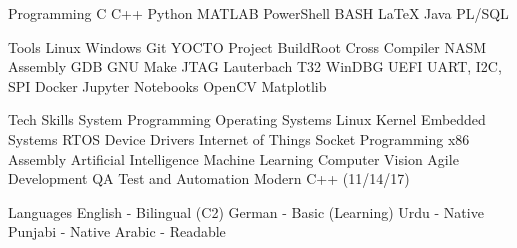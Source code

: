 

\begin{cvskills}

\cvskill
{Programming} %
{C \SkillSep C++ \SkillSep Python \SkillSep MATLAB \SkillSep PowerShell \SkillSep BASH \SkillSep LaTeX \SkillSep Java \SkillSep PL/SQL} %

\cvskill
{Tools} %
{Linux \SkillSep Windows \SkillSep Git \SkillSep YOCTO Project \SkillSep BuildRoot \SkillSep Cross Compiler \SkillSep NASM Assembly \SkillSep GDB \SkillSep GNU Make \SkillSep JTAG \SkillSep Lauterbach T32 \SkillSep WinDBG \SkillSep UEFI \SkillSep UART, I2C, SPI \SkillSep Docker \SkillSep Jupyter Notebooks \SkillSep OpenCV \SkillSep Matplotlib} %

\cvskill
{Tech Skills} %
{System Programming \SkillSep Operating Systems \SkillSep Linux Kernel \SkillSep Embedded Systems \SkillSep RTOS \SkillSep Device Drivers \SkillSep Internet of Things \SkillSep Socket Programming \SkillSep x86 Assembly \SkillSep Artificial Intelligence \SkillSep Machine Learning \SkillSep Computer Vision \SkillSep Agile Development \SkillSep QA Test and Automation \SkillSep Modern C++ (11/14/17)} %

\cvskill
{Languages} %
{English - Bilingual (C2) \SkillSep German - Basic (Learning) \SkillSep Urdu - Native \SkillSep Punjabi - Native \SkillSep Arabic - Readable} %

\end{cvskills}
